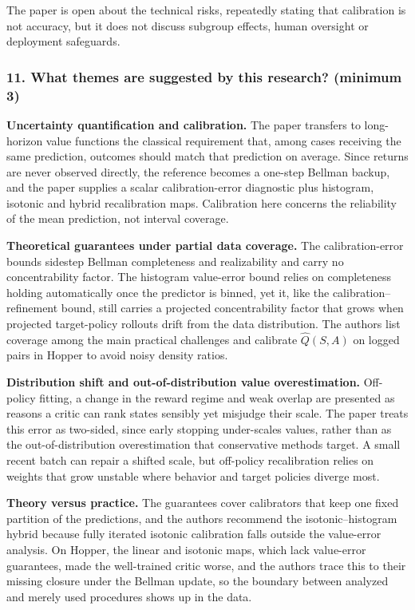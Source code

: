 \documentclass[11pt]{article}
\newcommand{\question}[1]{\subsubsection*{#1}}
\begin{document}
The paper is open about the technical risks, repeatedly stating that calibration is not accuracy, but it does not discuss subgroup effects, human oversight or deployment safeguards.

\question{11. What themes are suggested by this research? (minimum 3)}

\textbf{Uncertainty quantification and calibration.} The paper transfers to long-horizon value functions the classical requirement that, among cases receiving the same prediction, outcomes should match that prediction on average. Since returns are never observed directly, the reference becomes a one-step Bellman backup, and the paper supplies a scalar calibration-error diagnostic plus histogram, isotonic and hybrid recalibration maps. Calibration here concerns the reliability of the mean prediction, not interval coverage.

\textbf{Theoretical guarantees under partial data coverage.} The calibration-error bounds sidestep Bellman completeness and realizability and carry no concentrability factor. The histogram value-error bound relies on completeness holding automatically once the predictor is binned, yet it, like the calibration--refinement bound, still carries a projected concentrability factor that grows when projected target-policy rollouts drift from the data distribution. The authors list coverage among the main practical challenges and calibrate $\hat{Q}(S, A)$ on logged pairs in Hopper to avoid noisy density ratios.

\textbf{Distribution shift and out-of-distribution value overestimation.} Off-policy fitting, a change in the reward regime and weak overlap are presented as reasons a critic can rank states sensibly yet misjudge their scale. The paper treats this error as two-sided, since early stopping under-scales values, rather than as the out-of-distribution overestimation that conservative methods target. A small recent batch can repair a shifted scale, but off-policy recalibration relies on weights that grow unstable where behavior and target policies diverge most.

\textbf{Theory versus practice.} The guarantees cover calibrators that keep one fixed partition of the predictions, and the authors recommend the isotonic--histogram hybrid because fully iterated isotonic calibration falls outside the value-error analysis. On Hopper, the linear and isotonic maps, which lack value-error guarantees, made the well-trained critic worse, and the authors trace this to their missing closure under the Bellman update, so the boundary between analyzed and merely used procedures shows up in the data.
\end{document}
